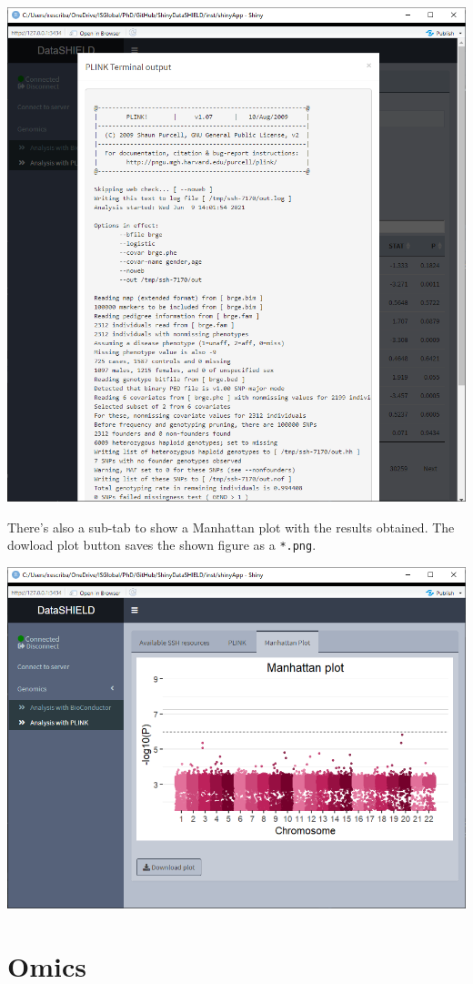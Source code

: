 \documentclass[
]{book}
\begin{document}
\includegraphics{images/genomics4.png}

There's also a sub-tab to show a Manhattan plot with the results obtained. The dowload plot button saves the shown figure as a \texttt{*.png}.

\includegraphics{images/genomics5.png}

\hypertarget{omics}{%
\section{Omics}\label{omics}}
\end{document}
